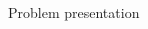 \documentclass{beamer}\usepackage[]{graphicx}\usepackage[]{color}
\begin{document}
\begin{frame}[fragile]{Problem presentation}
\begin{columns}
\begin{column}{0.4\textwidth}
\end{column}
\end{columns}
\end{frame}
\end{document}

